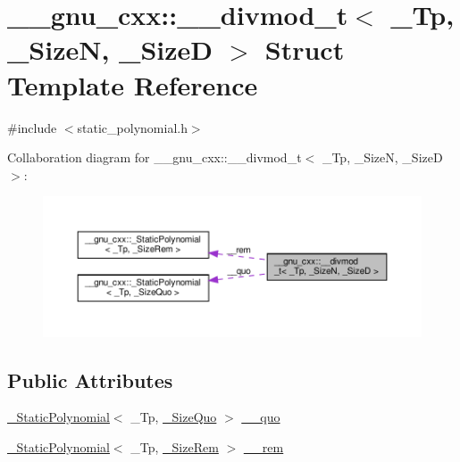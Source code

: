 \hypertarget{struct____gnu__cxx_1_1____divmod__t}{}\section{\+\_\+\+\_\+gnu\+\_\+cxx\+:\+:\+\_\+\+\_\+divmod\+\_\+t$<$ \+\_\+\+Tp, \+\_\+\+SizeN, \+\_\+\+SizeD $>$ Struct Template Reference}
\label{struct____gnu__cxx_1_1____divmod__t}


{\ttfamily \#include $<$static\+\_\+polynomial.\+h$>$}



Collaboration diagram for \+\_\+\+\_\+gnu\+\_\+cxx\+:\+:\+\_\+\+\_\+divmod\+\_\+t$<$ \+\_\+\+Tp, \+\_\+\+SizeN, \+\_\+\+SizeD $>$\+:
\nopagebreak
\begin{figure}[H]
\begin{center}
\leavevmode
\includegraphics[width=350pt]{struct____gnu__cxx_1_1____divmod__t__coll__graph}
\end{center}
\end{figure}
\subsection*{Public Attributes}
\begin{DoxyCompactItemize}
\item 
\hyperlink{class____gnu__cxx_1_1__StaticPolynomial}{\+\_\+\+Static\+Polynomial}$<$ \+\_\+\+Tp, \hyperlink{struct____gnu__cxx_1_1____divmod__t_a813f65f5716a3d6b124020686b294a24}{\+\_\+\+Size\+Quo} $>$ \hyperlink{struct____gnu__cxx_1_1____divmod__t_a2d1cdc2ca4c92306d199cb1b70c1b7a2}{\+\_\+\+\_\+quo}
\item 
\hyperlink{class____gnu__cxx_1_1__StaticPolynomial}{\+\_\+\+Static\+Polynomial}$<$ \+\_\+\+Tp, \hyperlink{struct____gnu__cxx_1_1____divmod__t_a77870c1b7361b2b7511b0ef4d958826c}{\+\_\+\+Size\+Rem} $>$ \hyperlink{struct____gnu__cxx_1_1____divmod__t_ae3b5e6634fc53682a87e21d80fe44840}{\+\_\+\+\_\+rem}
\end{DoxyCompactItemize}
